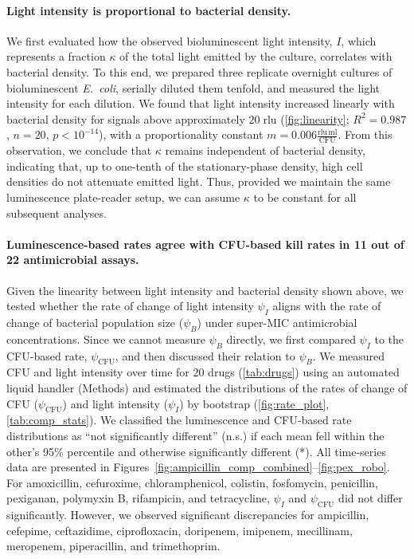 \paragraph{Light intensity is proportional to bacterial density.}
We first evaluated how the observed bioluminescent light intensity, \(I\), which represents a fraction \(\kappa\) of the total light emitted by the culture, correlates with bacterial density.
To this end, we prepared three replicate overnight cultures of bioluminescent \emph{E.\ coli}, serially diluted them tenfold, and measured the light intensity for each dilution.
We found that light intensity increased linearly with bacterial density for signals above approximately \(20\;\mathrm{rlu}\) (\autoref{fig:linearity}; \(R^{2}=0.987\), \(n=20\), \(p<10^{-14}\)), with a  proportionality constant \(m = 0.006 \frac{\mathrm{rlu}\,\mathrm{ml}}{\mathrm{CFU}}\).
From this observation, we conclude that \(\kappa\) remains independent of bacterial density,  indicating that, up to one-tenth of the stationary-phase density, high cell densities do not attenuate emitted light.
Thus, provided we maintain the same luminescence plate-reader setup, we can assume \(\kappa\) to be constant for all subsequent analyses.

\paragraph{Luminescence-based rates agree with CFU-based kill rates in 11 out of 22 antimicrobial assays.}
Given the linearity between light intensity and bacterial density shown above, we tested whether the rate of change of light intensity $\psi_I$ aligns with the rate of change of bacterial population size ($\psi_B$) under super-MIC antimicrobial concentrations.
Since we cannot measure $\psi_B$ directly, we first compared $\psi_I$ to the CFU-based rate, $\psi_\mathrm{CFU}$, and then discussed their relation to $\psi_B$.
We measured CFU and light intensity over time for 20 drugs (\autoref{tab:drugs}) using an automated liquid handler (Methods) and estimated the distributions of the rates of change of CFU ($\psi_{\mathrm{CFU}}$) and light intensity ($\psi_I$) by bootstrap (\autoref{fig:rate_plot}, \autoref{tab:comp_stats}).
We classified the luminescence and CFU‐based rate distributions as ``not significantly different''  (n.s.) if each mean fell within the other's 95\% percentile and otherwise significantly different (*).
All time-series data are presented in Figures~\ref{fig:ampicillin_comp_combined}--\ref{fig:pex_robo}.
For amoxicillin, cefuroxime, chloramphenicol, colistin, fosfomycin, penicillin, pexiganan, polymyxin B, rifampicin, and tetracycline, $\psi_I$ and $\psi_\mathrm{CFU}$ did not differ significantly.
However, we observed significant discrepancies for ampicillin, cefepime, ceftazidime, ciprofloxacin, doripenem, imipenem, mecillinam, meropenem, piperacillin, and trimethoprim.


